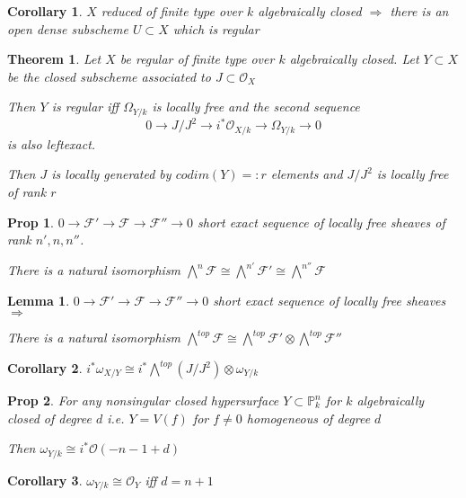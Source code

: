 \documentclass[a4paper, 12pt]{article}
\newcommand{\ca}[1]{\mathcal{#1}}
\newcommand{\caf}{\mathcal{F}}
\newcommand{\ox}{\mathcal{O}_X}
\newcommand{\oy}{\mathcal{O}_Y}
\newcommand{\bbp}{\mathbb{P}}
\newtheorem*{prop}{Prop}
\newtheorem*{lem}{Lemma}
\newtheorem*{thm}{Theorem}
\newtheorem*{cor}{Corollary}
\begin{document}
	\begin{cor}
		$ X $ reduced of finite type over $ k $ algebraically closed  $ \Rightarrow $ there is an open dense subscheme $ U \subset X $ which is regular
	\end{cor}
	
	\begin{thm}
		Let $ X $ be regular of finite type over $ k $ algebraically closed. Let $ Y \subset X $ be the closed subscheme associated to $ J \subset \ox  $
		
		Then $ Y $ is regular iff $ \Omega_{Y/k} $ is locally free and the second sequence 
		\[ 0 \rightarrow J/J^2 \rightarrow i^* \ca{O}_{X/k} \rightarrow \Omega_{Y/k} \rightarrow 0 \]
		is also leftexact.
		
		Then $ J $ is locally generated by $ codim(Y)=: r $ elements and $ J/J^2 $ is locally free of rank $ r $
	\end{thm}
	
	\begin{prop}
		$ 0 \rightarrow \caf ' \rightarrow \caf \rightarrow \caf '' \rightarrow 0 $ short exact sequence of locally free sheaves of rank $ n',n,n'' $.
		
		There is a natural isomorphism $ \bigwedge^n \caf \cong \bigwedge ^{n'} \caf ' \cong \bigwedge ^{n''} \caf $
	\end{prop}
	
	\begin{lem}
		$ 0 \rightarrow \caf ' \rightarrow \caf \rightarrow \caf '' \rightarrow 0 $ short exact sequence of locally free sheaves $ \Rightarrow $ 
		
		There is a natural isomorphism $ \bigwedge ^{top} \caf \cong \bigwedge^{top} \caf ' \otimes \bigwedge^{top} \caf '' $
	\end{lem}
	
	\begin{cor}
		$ i^* \omega_{X/Y} \cong i^* \bigwedge^{top} (J/J^2) \otimes \omega_{Y/k} $
	\end{cor}
	
	\begin{prop}
		For any nonsingular closed hypersurface $ Y \subset \bbp^n_k  $ for $ k $ algebraically closed of degree $ d $ i.e. $ Y = V(f) $ for $ f \neq 0 $ homogeneous of degree $ d $ 
		
		Then $ \omega_{Y/k} \cong i^* \ca{O}(-n-1+d) $
	\end{prop}
	
	\begin{cor}
		$ \omega_{Y/k} \cong \oy $ iff $ d = n+1 $
	\end{cor}
	
\end{document}
